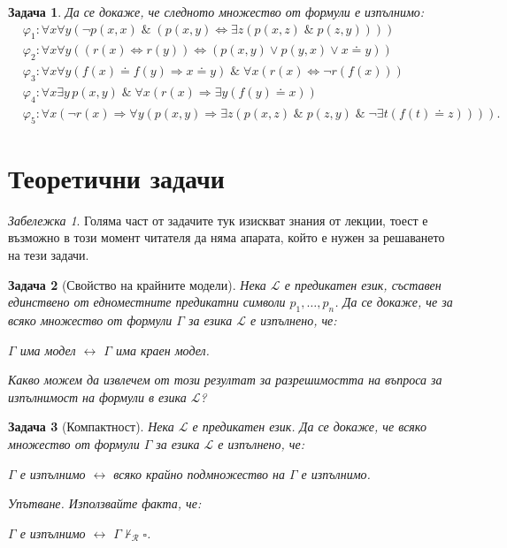 \documentclass[12pt]{article}
\newcommand{\calL}{\mathcal{L}}
\newcommand{\calR}{\mathcal{R}}
\newtheorem{problem}{Задача}[section]
\theoremstyle{definition}
\theoremstyle{remark}
\newtheorem*{remark}{Забележка}
\begin{document}
\begin{problem}
Да се докаже, че следното множество от формули е изпълнимо:
\begin{align*}
       & \varphi_1 : \forall x \forall y (\neg p(x, x) \; \& \; (p(x, y) \Leftrightarrow \exists z (p(x, z) \; \& \; p(z, y))))                                      \\
       & \varphi_2 : \forall x \forall y ((r(x) \Leftrightarrow r(y)) \Leftrightarrow (p(x, y) \lor p(y, x) \lor x \doteq y))                                        \\
       & \varphi_3 : \forall x \forall y (f(x) \doteq f(y) \Rightarrow x \doteq y) \; \& \; \forall x (r(x) \Leftrightarrow \neg r(f(x)))                            \\
       & \varphi_4 : \forall x \exists y \, p(x, y) \; \& \; \forall x (r(x) \Rightarrow \exists y (f(y) \doteq x))                                                  \\
       & \varphi_5 : \forall x (\neg r(x) \Rightarrow \forall y (p(x, y) \Rightarrow \exists z (p(x, z) \; \& \; p(z, y) \; \& \; \neg \exists t (f(t) \doteq z)))).
\end{align*}
\end{problem}

\newpage

\section{Теоретични задачи}

\begin{remark}
       Голяма част от задачите тук изискват знания от лекции, тоест е възможно в този момент читателя да няма апарата, който е нужен за решаването на тези задачи.
\end{remark}

\begin{problem}[Свойство на крайните модели]
Нека $\calL$ е предикатен език, съставен единствено от едноместните предикатни символи $p_1, \dots, p_n$.
Да се докаже, че за всяко множество от формули $\Gamma$ за езика $\calL$ е изпълнено, че:
\begin{center}
       $\Gamma$ има модел $\longleftrightarrow$ $\Gamma$ има краен модел.
\end{center}
Какво можем да извлечем от този резултат за разрешимостта на въпроса за изпълнимост на формули в езика $\calL$?
\end{problem}

\begin{problem}[Компактност]
Нека $\calL$ е предикатен език.
Да се докаже, че всяко множество от формули $\Gamma$ за езика $\calL$ е изпълнено, че:
\begin{center}
       $\Gamma$ е изпълнимо $\longleftrightarrow$ всяко крайно подмножество на $\Gamma$ е изпълнимо.
\end{center}
Упътване. Използвайте факта, че:
\begin{center}
       $\Gamma$ е изпълнимо $\longleftrightarrow$ $\Gamma \not \vdash_\calR \square$.
\end{center}
\end{problem}
\end{document}
